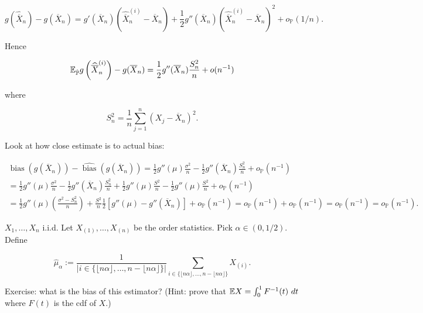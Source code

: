 \[
g(\widehat{\overline{X}}_n)  - g(\overline{X}_n) = g'(\overline{X}_n) (\widehat{\overline{X}}_n^{(i)} - \overline{X}_n) + \frac{1}{2} g''(\overline{X}_n)( \widehat{\overline{X}}_n^{(i)} - \overline{X}_n)^2 + o_{\mathbb{P}}(1/n).
\]

Hence

\[
\E_{\hat{\mathbb{P}}} g \left( \widehat{\overline{X}}_n^{(i)} \right) - g(\overline{X}_n) = \frac{1}{2} g''(\overline{X}_n) \frac{S_n^2}{n} + o(n^{-1})
\]

where 

\[
S_n^2 = \frac{1}{n} \sum_{j=1}^n (X_j - \overline{X}_n)^2.
\]

Look at how close estimate is to actual bias:

\begin{multline*}
\operatorname{bias}(g(\overline{X}_n)) - \widehat{\operatorname{bias}}(g(\overline{X}_n)) = \frac{1}{2} g''(\mu) \frac{\sigma^2}{n} - \frac{1}{2} g''(\overline{X}_n) \frac{S_n^2}{n} + o_{\mathbb{P}} (n^{-1})
\\  = \frac{1}{2} g''(\mu) \frac{\sigma^2}{n} - \frac{1}{2} g''(\overline{X}_n)  \frac{S_n^2}{n} + \frac{1}{2} g''(\mu) \frac{S^2}{n} -  \frac{1}{2} g''(\mu) \frac{S^2}{n}   + o_{\mathbb{P}} (n^{-1}) 
\\  = \frac{1}{2} g''(\mu) \left( \frac{\sigma^2 - S_n^2 }{n} \right)  +  \frac{S^2}{n} \frac{1}{2}\left[  g''(\mu) - g''(\overline{X}_n) \right]  + o_{\mathbb{P}} (n^{-1}) = o_{\mathbb{P}}(n^{-1}) + o_{\mathbb{P}}(n^{-1}) = o_{\mathbb{P}}(n^{-1}) = o_{\mathbb{P}}(n^{-1}).
\end{multline*}

\begin{example} \(X_1, \ldots, X_n\) i.i.d. Let \(X_{(1)}, \ldots, X_{(n)}\) be the order statistics. Pick \(\alpha \in (0,1/2)\). Define

\[
\hat{\mu}_\alpha := \frac{1}{  \left| i \in \{ \lfloor n \alpha \rfloor, \ldots, n - \lfloor n \alpha \rfloor\} \right|} \sum_{i \in\{ \lfloor n \alpha \rfloor, \ldots, n - \lfloor n \alpha \rfloor\}} X_{(i)}.
\]

Exercise: what is the bias of this estimator? (Hint: prove that \(\E X = \int_0^1 F^{-1}(t) \ dt \) where \(F(t) \) is the cdf of \(X\).)

\end{example}

